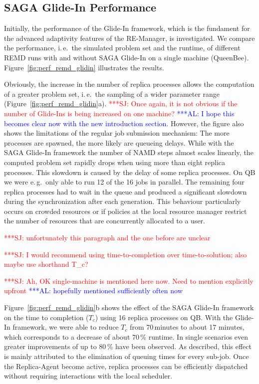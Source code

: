 \documentclass{rspublic}
\newcommand{\alnote}[1]{ {\textcolor{blue} { ***AL: #1 }}}
\newcommand{\jhanote}[1]{ {\textcolor{red} { ***SJ: #1 }}}
\newcommand{\alnote}[1]{}
\newcommand{\jhanote}[1]{}
\begin{document}
{\subsection{SAGA Glide-In Performance}

Initially, the performance of the Glide-In framework, which is the 
fundament for the advanced adaptivity features of the RE-Manager, is investigated. 
We compare the performance, i.\,e.\ the simulated
problem set and the runtime, of different REMD runs with and without 
SAGA Glide-In on a single machine (QueenBee). 
Figure~\ref{fig:perf_remd_glidin} illustrates the results.

Obviously, the increase in the number of replica processes allows 
the computation of a greater problem set, i.\,e.\ the sampling of 
a wider parameter range (Figure~\ref{fig:perf_remd_glidin}a).
\jhanote{Once again, it is not obvious if the number of Glide-Ins is
  being increased on one machine?} 
\alnote{I hope this becomes clear now with the new introduction section.} 
However, the figure also shows the limitations of the regular job submission 
mechanism: The more processes are spawned, the more likely are queueing delays. 
While with the SAGA Glide-In framework the number of NAMD steps almost scales
linearly, the computed problem set rapidly drops when using more than
eight replica processes. This slowdown is caused by the delay of some replica processes. 
On QB we were e.\,g.\ only able to run 12 of the 16 jobs in parallel. 
The remaining four replica processes had to wait in the queue and
produced a significant slowdown during the synchronization after each generation.
This behaviour particularly occurs on crowded resources or if policies at the 
local resource manager restrict the number of resources that are concurrently
allocated to a user.

\jhanote{unfortunately this paragraph and the one before are unclear}

\jhanote{I would recommend using time-to-completion over
  time-to-solution; also maybe use shorthand T\_c?}
 
\jhanote{Ah, OK single-machine is mentioned here now. Need to mention
    explicitly upfront}
\alnote{hopefully mentioned sufficiently often now}      

Figure~\ref{fig:perf_remd_glidin}b shows the effect of the SAGA Glide-In framework
on the time to completion ($T_{c}$) using 16 replica processes on QB. 
With the Glide-In framework, we were able to reduce $T_{c}$ from 70\,minutes
to about 17 minutes, which corresponds to a decrease of about 70\,\% runtime. 
In single scenarios even greater improvements of up to 80\,\% have been 
observed. As described, this effect is mainly attributed to the elimination of 
queuing times for every sub-job. Once the Replica-Agent become active, 
replica processes can be efficiently dispatched without requiring interactions 
with the local scheduler. 

}
\end{document}
